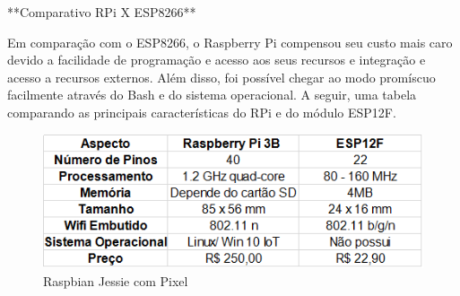 **Comparativo RPi X ESP8266**

Em comparação com o ESP8266, o Raspberry Pi compensou seu custo mais caro devido
a facilidade de programação e acesso aos seus recursos e integração e acesso a
recursos externos. Além disso, foi possível chegar ao modo promíscuo facilmente
através do Bash e do sistema operacional. A seguir, uma tabela comparando as
principais características do RPi e do módulo ESP12F.

\begin{figure}[htb]
	\caption{\label{fig-raspbian-jessie}Raspbian Jessie com Pixel}
	\begin{center}
		\includegraphics[width=1\textwidth]{040-plataformas/Plataformas DIY e comparacao/rpi-esp.png}
	\end{center}
\end{figure}
